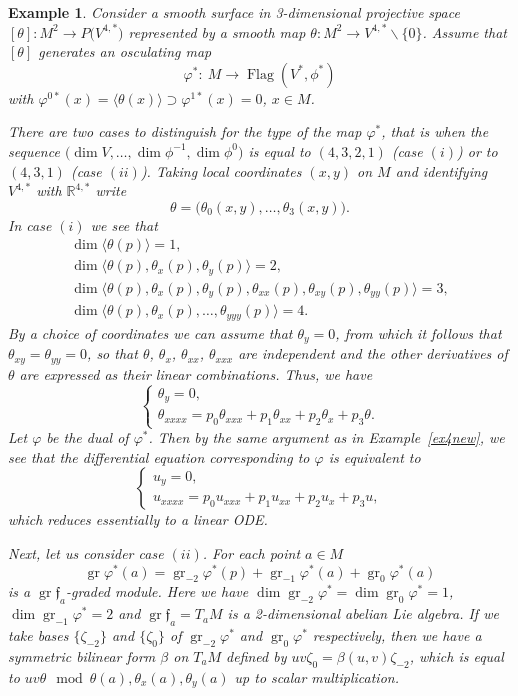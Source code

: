 \documentclass[pdftex]{sigma}%
\newcommand{\R}{\mathbb R}
\newcommand{\cD}{\mathcal D}
\newcommand{\f}{\mathfrak f}
\newcommand{\Flag}{\operatorname{Flag}}
\newcommand{\gr}{\operatorname{gr}}
\newtheorem{ex}[thm]{Example}
\numberwithin{equation}{section}
\begin{document}
\begin{ex}%
Consider a smooth surface in 3-dimensional projective space $[\theta]\colon M^2\to P\big(V^{4,*}\big)$ represented by a smooth map $\theta\colon M^2\to V^{4,*}\backslash \{0\}$. Assume that $[\theta]$ generates an osculating map
\[
\varphi^* \colon\ M\to \Flag(V^*,\phi^*)
\]
with $\varphi^{0*}(x)=\langle \theta(x)\rangle \supset \varphi^{1*}(x)=0$, $x\in M$.

There are two cases to distinguish for the type of the map $\varphi^*$, that is when the sequence $\big(\dim V,\dots,\dim \phi^{-1},\dim \phi^0\big)$ is equal to $(4,3,2,1)$ (case $(i)$) or to $(4,3,1)$ (case $(ii)$). Taking local coordinates $(x,y)$ on $M$ and identifying $V^{4,*}$ with $\R^{4,*}$ write
\[
\theta = \big(\theta_0(x,y),\dots, \theta_3(x,y)\big).
\]
In case $(i)$ we see that
\begin{gather*}
\dim \big\langle \theta(p) \big\rangle = 1,\\[.3ex]
\dim \big\langle \theta(p), \theta_x(p), \theta_y(p) \big\rangle = 2,\\[.3ex]
\dim \big\langle \theta(p), \theta_x(p), \theta_y(p), \theta_{xx}(p), \theta_{xy}(p), \theta_{yy}(p) \big\rangle = 3,\\[.3ex]
\dim \big\langle \theta(p), \theta_x(p), \dots, \theta_{yyy}(p) \big\rangle = 4.
\end{gather*}
By a choice of coordinates we can assume that $\theta_y=0$, from which it follows that $\theta_{xy}=\theta_{yy}=0$, so that $\theta$, $\theta_x$, $\theta_{xx}$, $\theta_{xxx}$ are independent and the other derivatives of $\theta$ are expressed as their linear combinations. Thus, we have
\[
\begin{cases}
\theta_y=0,\\
\theta_{xxxx} = p_0\theta_{xxx}+p_1\theta_{xx}+p_2\theta_{x}+p_3\theta.
\end{cases}
\]
Let $\varphi$ be the dual of $\varphi^*$. Then by the same argument as in Example~\ref{ex4new}, we see that the differential equation corresponding to $\varphi$ is equivalent to
\begin{equation}
\tag{$\cD_i$}
\begin{cases}
u_y=0,\\
u_{xxxx} = p_0u_{xxx}+p_1u_{xx}+p_2u_{x}+p_3u,
\end{cases}
\end{equation}
which reduces essentially to a linear ODE.

Next, let us consider case $(ii)$. For each point $a\in M$
\[
\gr \varphi^*(a) = \gr_{-2}\varphi^*(p)+\gr_{-1}\varphi^*(a)+\gr_0\varphi^*(a)
\]
is a $\gr\f_a$-graded module. Here we have $\dim \gr_{-2}\varphi^*=\dim\gr_{0}\varphi^*=1$, $\dim\gr_{-1}\varphi^*=2$ and $\gr\f_a=T_aM$ is a 2-dimensional abelian Lie algebra. If we take bases $\{\zeta_{-2}\}$ and $\{\zeta_{0}\}$ of $\gr_{-2}\varphi^*$ and $\gr_0\varphi^*$ respectively, then we have a symmetric bilinear form $\beta$ on $T_aM$ defined by $uv\zeta_0 = \beta(u,v)\zeta_{-2}$, which is equal to $uv\theta \mod \theta(a),\theta_x(a),\theta_y(a)$ up to scalar multiplication.


\end{ex}
\end{document}
